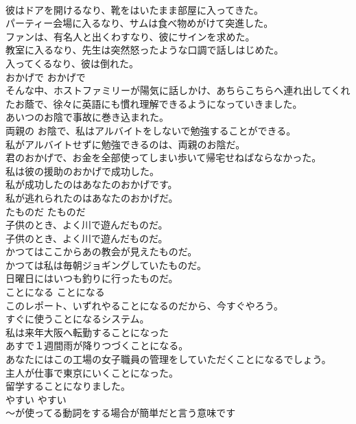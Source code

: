\documentclass[8pt]{extreport}
\begin{document}
\begin{CJK}{UTF8}{min}
\\	彼はドアを開けるなり、靴をはいたまま部屋に入ってきた。  
\\	パーティー会場に入るなり、サムは食べ物めがけて突進した。  
\\	ファンは、有名人と出くわすなり、彼にサインを求めた。  
\\	教室に入るなり、先生は突然怒ったような口調で話しはじめた。  
\\	入ってくるなり、彼は倒れた。  
\\	おかげで	おかげで	
\\	そんな中、ホストファミリーが陽気に話しかけ、あちらこちらへ連れ出してくれたお蔭で、徐々に英語にも慣れ理解できるようになっていきました。  
\\	あいつのお陰で事故に巻き込まれた。  
\\	両親の お陰で、私はアルバイトをしないで勉強することができる。  
\\	私がアルバイトせずに勉強できるのは、両親のお陰だ。  
\\	君のおかげで、お金を全部使ってしまい歩いて帰宅せねばならなかった。   
\\	私は彼の援助のおかげで成功した。   
\\	私が成功したのはあなたのおかげです。   
\\	私が逃れられたのはあなたのおかげだ。   
\\	たものだ	たものだ	
\\	子供のとき、よく川で遊んだものだ。	
\\	子供のとき、よく川で遊んだものだ。  
\\	かつてはここからあの教会が見えたものだ。   
\\	かつては私は毎朝ジョギングしていたものだ。   
\\	日曜日にはいつも釣りに行ったものだ。   
\\	ことになる	ことになる	
\\	このレポート、いずれやることになるのだから、今すぐやろう。  
\\	すぐに使うことになるシステム。  
\\	私は来年大阪へ転勤することになった  
\\	あすで１週間雨が降りつづくことになる。   
\\	あなたにはこの工場の女子職員の管理をしていただくことになるでしょう。   
\\	主人が仕事で東京にいくことになった。  
\\	留学することになりました。  
\\	やすい	やすい	
\\	〜が使ってる動詞をする場合が簡単だと言う意味です	

\end{CJK}
\end{document}
